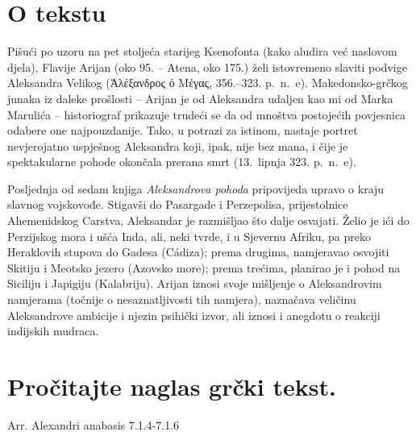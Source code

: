 


\section*{O tekstu}

Pišući po uzoru na pet stoljeća starijeg Ksenofonta (kako aludira već naslovom djela), Flavije Arijan (oko 95. – Atena, oko 175.) želi istovremeno slaviti podvige Aleksandra Velikog (Ἀλέξανδρος ὁ Μέγας, 356.–323. p.~n.~e). Makedonsko-grčkog junaka iz daleke prošlosti – Arijan je od Aleksandra udaljen kao mi od Marka Marulića – historiograf prikazuje trudeći se da od mnoštva postojećih povjesnica odabere one najpouzdanije. Tako, u potrazi za istinom, nastaje portret nevjerojatno uspješnog Aleksandra koji, ipak, nije bez mana, i čije je spektakularne pohode okončala prerana smrt (13.\ lipnja 323. p.~n.~e).

Posljednja od sedam knjiga \textit{Aleksandrova pohoda} pripovijeda upravo o kraju slavnog vojskovođe. Stigavši do Pasargade i Perzepolisa, prijestolnice Ahemenidskog Carstva, Aleksandar je razmišljao što dalje osvajati. Želio je ići do Perzijskog mora i ušća Inda, ali, neki tvrde, i u Sjevernu Afriku, pa preko Heraklovih stupova do Gadesa (Cádiza); prema drugima, namjeravao osvojiti Skitiju i Meotsko jezero (Azovsko more); prema trećima, planirao je i pohod na Siciliju i Japigiju (Kalabriju). Arijan iznosi svoje mišljenje o Aleksandrovim namjerama (točnije o nesaznatljivosti tih namjera), naznačava veličinu Aleksandrove ambicije i njezin psihički izvor, ali iznosi i anegdotu o reakciji indijskih mudraca.

\newpage

\section*{Pročitajte naglas grčki tekst.}

Arr. Alexandri anabasis 7.1.4-7.1.6


\medskip


